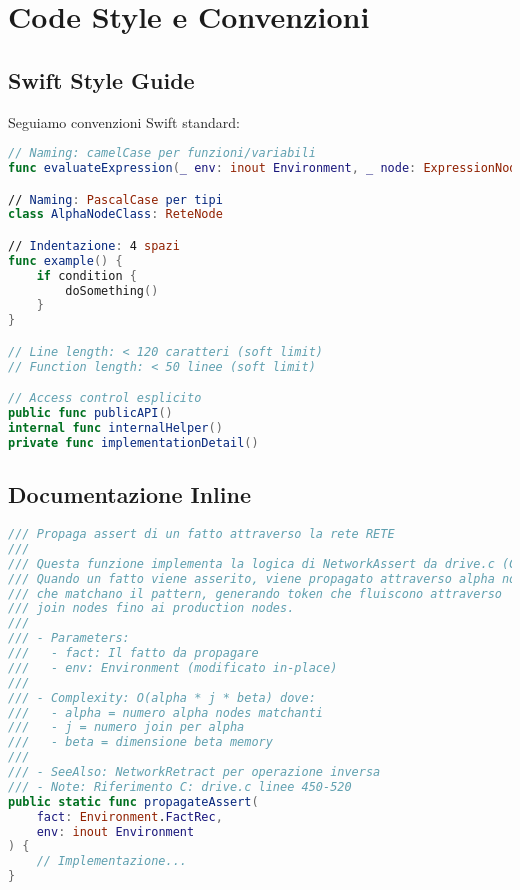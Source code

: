 \section{Code Style e Convenzioni}

\subsection{Swift Style Guide}

Seguiamo convenzioni Swift standard:

\begin{lstlisting}[language=Swift]
// Naming: camelCase per funzioni/variabili
func evaluateExpression(_ env: inout Environment, _ node: ExpressionNode) -> Value

// Naming: PascalCase per tipi
class AlphaNodeClass: ReteNode

// Indentazione: 4 spazi
func example() {
    if condition {
        doSomething()
    }
}

// Line length: < 120 caratteri (soft limit)
// Function length: < 50 linee (soft limit)

// Access control esplicito
public func publicAPI()
internal func internalHelper()
private func implementationDetail()
\end{lstlisting}

\subsection{Documentazione Inline}

\begin{lstlisting}[language=Swift]
/// Propaga assert di un fatto attraverso la rete RETE
///
/// Questa funzione implementa la logica di NetworkAssert da drive.c (CLIPS).
/// Quando un fatto viene asserito, viene propagato attraverso alpha nodes
/// che matchano il pattern, generando token che fluiscono attraverso
/// join nodes fino ai production nodes.
///
/// - Parameters:
///   - fact: Il fatto da propagare
///   - env: Environment (modificato in-place)
///
/// - Complexity: O(alpha * j * beta) dove:
///   - alpha = numero alpha nodes matchanti
///   - j = numero join per alpha
///   - beta = dimensione beta memory
///
/// - SeeAlso: NetworkRetract per operazione inversa
/// - Note: Riferimento C: drive.c linee 450-520
public static func propagateAssert(
    fact: Environment.FactRec,
    env: inout Environment
) {
    // Implementazione...
}
\end{lstlisting}

